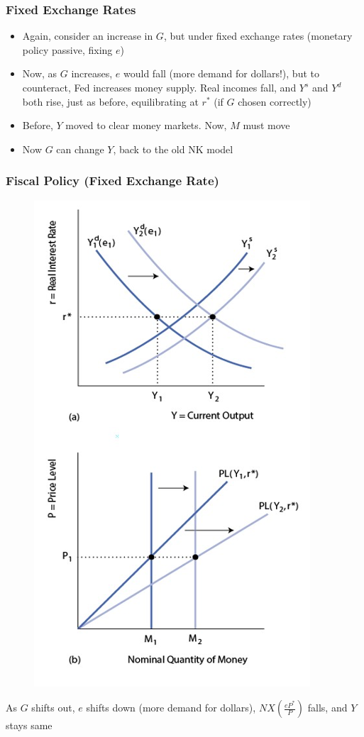 \documentclass{beamer}
\begin{document}
\begin{frame}
\frametitle[alignment=center]{Fixed Exchange Rates}
\begin{itemize}
\item Again, consider an increase in $G$, but under fixed exchange rates (monetary policy passive, fixing $e$)
\bigskip
\item Now, as $G$ increases, $e$ would fall (more demand for dollars!), but to counteract, Fed increases money supply.  Real incomes fall, and $Y^s$ and $Y^d$ both rise, just as before, equilibrating at $r^*$ (if $G$ chosen correctly)
\bigskip
\item Before, $Y$ moved to clear money markets.  Now, $M$ must move 
\bigskip
\item Now $G$ can change $Y$, back to the old NK model
\end{itemize}
\end{frame}


\begin{frame}
\frametitle[alignment=center]{Fiscal  Policy (Fixed Exchange Rate)}
\begin{figure}
\centering
\includegraphics[scale=0.55]{Figures/W_Fig_17pt16.png}
\end{figure}
As $G$ shifts out, $e$ shifts down (more demand for dollars), $NX\left(\frac{eP^*}{P}\right)$ falls, and $Y$ stays same
\end{frame}
\end{document}
